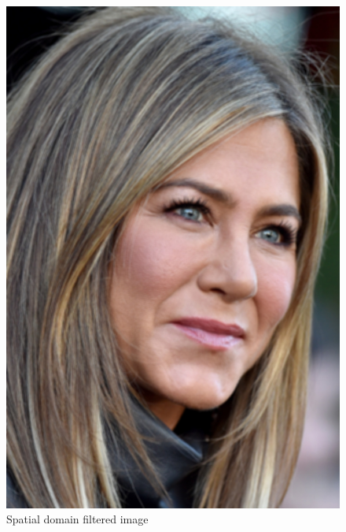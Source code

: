 \documentclass[a4paper]{article}
\begin{document}
\begin{minipage}{0.33\textwidth}
\begin{figure}[H]
    \centering
    \includegraphics[width=\textwidth]{../code/task2/output/jennifer_spatial.jpg}
    \caption{Spatial domain filtered image}
\end{figure}
\end{minipage}
\hfill
\end{document}
